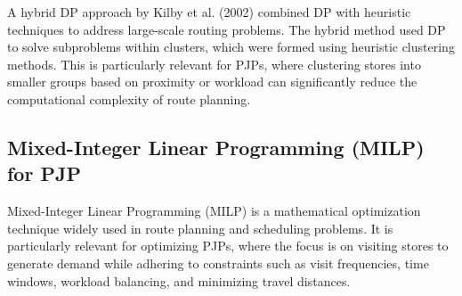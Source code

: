 A hybrid DP approach by Kilby et al. (2002) \cite{Kilby2002} combined DP with heuristic techniques to address large-scale routing problems. The hybrid method used DP to solve subproblems within clusters, which were formed using heuristic clustering methods. This is particularly relevant for PJPs, where clustering stores into smaller groups based on proximity or workload can significantly reduce the computational complexity of route planning.




\subsection{Mixed-Integer Linear Programming (MILP) for PJP}
Mixed-Integer Linear Programming (MILP) is a mathematical optimization technique widely used in route planning and scheduling problems. It is particularly relevant for optimizing PJPs, where the focus is on visiting stores to generate demand while adhering to constraints such as visit frequencies, time windows, workload balancing, and minimizing travel distances.

